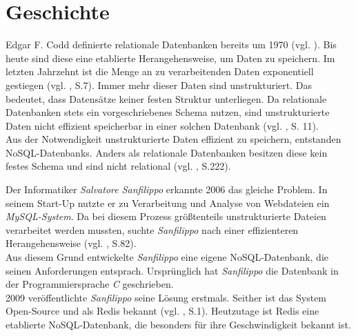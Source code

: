 
\section{Geschichte}
\label{Geschichte}
Edgar F. Codd definierte relationale Datenbanken bereits um 1970 (vgl. \cite{codd}). Bis heute sind diese eine etablierte Herangehensweise, um Daten zu speichern. Im letzten Jahrzehnt ist die Menge an zu verarbeitenden Daten exponentiell gestiegen (vgl. \cite{nosql}, S.7). Immer mehr dieser Daten sind unstrukturiert. Das bedeutet, dass Datensätze keiner festen Struktur unterliegen. Da relationale Datenbanken stets ein vorgeschriebenes Schema nutzen, sind unstrukturierte Daten nicht effizient speicherbar in einer solchen Datenbank (vgl. \cite{2016sql}, S. 11). 
\\Aus der Notwendigkeit unstrukturierte Daten effizient zu speichern, entstanden \acp{NoSQL-Datenbank}. Anders als relationale Datenbanken besitzen diese kein festes Schema und sind nicht relational (vgl. \cite{2016sql}, S.222).

Der Informatiker \textit{Salvatore Sanfilippo} erkannte 2006 das gleiche Problem. In seinem Start-Up nutzte er zu Verarbeitung und Analyse von Webdateien ein\textit{ MySQL-System}. Da bei diesem Prozess größtenteils unstrukturierte Dateien verarbeitet werden mussten, suchte \textit{Sanfilippo} nach einer effizienteren Herangehensweise (vgl. \cite{nosql}, S.82).
\\Aus diesem Grund entwickelte \textit{Sanfilippo} eine eigene \acs{NoSQL-Datenbank}, die seinen Anforderungen entsprach. Ursprünglich hat \textit{Sanfilippo} die Datenbank in der Programmiersprache \textit{C} geschrieben.
\\2009 veröffentlichte \textit{Sanfilippo} seine Lösung erstmals. Seither ist das System Open-Source und als \acs{Redis} bekannt (vgl. \cite{learningRedis}, S.1). Heutzutage ist \acs{Redis} eine etablierte \acs{NoSQL-Datenbank}, die besonders für ihre Geschwindigkeit bekannt ist. 